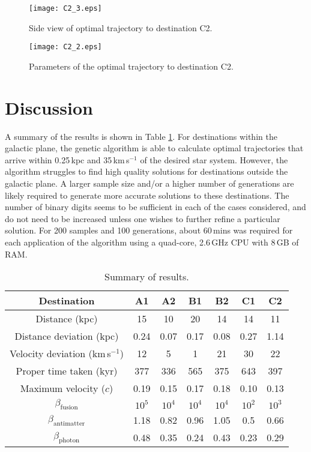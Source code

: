 \documentclass[review]{elsarticle}
\begin{document}
\begin{figure}[h!]
\centering
\texttt{[image: C2\_3.eps]}
\caption{Side view of optimal trajectory to destination C2.}
\label{C2_1}
\end{figure}

\begin{figure}[h!]
\centering
\texttt{[image: C2\_2.eps]}
\caption{Parameters of the optimal trajectory to destination C2.}
\label{C2_2}
\end{figure}

\section{Discussion}
A summary of the results is shown in Table \ref{summary}. For destinations within the galactic plane, the genetic algorithm is able to calculate optimal trajectories that arrive within 0.25\,kpc and 35\,km\,s$^{-1}$ of the desired star system. However, the algorithm struggles to find high quality solutions for destinations outside the galactic plane. A larger sample size and/or a higher number of generations are likely required to generate more accurate solutions to these destinations. The number of binary digits seems to be sufficient in each of the cases considered, and do not need to be increased unless one wishes to further refine a particular solution. For 200 samples and 100 generations, about 60\,mins was required for each application of the algorithm using a quad-core, 2.6\,GHz CPU with 8\,GB of RAM.

\begin{table}[h!]
\begin{center}
\begin{tabular}{|c|c|c|c|c|c|c|}
\hline
Destination & A1 & A2 & B1 & B2 & C1 & C2\\
\hline
Distance (kpc) & 15 & 10 & 20 & 14 & 14 & 11\\
\hline
Distance deviation (kpc) & 0.24 & 0.07 & 0.17 & 0.08 & 0.27 & 1.14\\
\hline
Velocity deviation (km\,s$^{-1}$) & 12 & 5 & 1 & 21 & 30 & 22\\
\hline
Proper time taken (kyr) & 377 & 336 & 565 & 375 & 643 & 397\\
\hline
Maximum velocity ($c$) & 0.19 & 0.15 & 0.17 & 0.18 & 0.10 & 0.13\\
\hline
$\beta_\mathrm{fusion}$ & $10^5$ & $10^4$ & $10^4$ & $10^4$ & $10^2$ & $10^3$\\
\hline
$\beta_\mathrm{antimatter}$ & 1.18 & 0.82 & 0.96 & 1.05 & 0.5 & 0.66\\
\hline
$\beta_\mathrm{photon}$ & 0.48 & 0.35 & 0.24 & 0.43 & 0.23 & 0.29\\
\hline
\end{tabular}
\caption{Summary of results.}
\label{summary}
\end{center}
\end{table}
\end{document}
